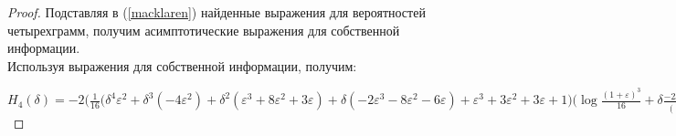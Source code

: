 ﻿\documentclass[a4paper,12pt]{article}
\theoremstyle{plain}
\begin{document}
\begin{proof}
	Подставляя в (\ref{macklaren}) найденные выражения для вероятностей четырехграмм, получим асимптотические выражения для собственной информации. \\
	Используя выражения для собственной информации, получим:
	
	$H_4(\delta)=-2\biggr(
	\tfrac{1}{16}\bigr(\delta^4\varepsilon^2+\delta^3(-4\varepsilon^2)+\delta^2(\varepsilon^3+8\varepsilon^2+3\varepsilon)+\delta(-2\varepsilon^3-8\varepsilon^2-6\varepsilon)+\varepsilon^3+3\varepsilon^2+3\varepsilon+1\bigr)\bigr(\log\frac{(1+\varepsilon)^3}{16} + \delta \frac{-2\varepsilon^3-8\varepsilon^2-6\varepsilon}{(1+\varepsilon)^3\ln b} +O(\delta^2)\bigr) +
	2\tfrac{1}{16}\bigr(\delta^4(-\varepsilon^2)+\delta^3\cdot4\varepsilon^2+\delta^2(-\varepsilon^3-6\varepsilon^2+\varepsilon)+\delta(2\varepsilon^3+4\varepsilon^2-2\varepsilon)-\varepsilon^3-\varepsilon^2+\varepsilon+1\bigr)\bigr(\log\frac{(1-\varepsilon)(1+\varepsilon)^2}{16} + \delta \frac{2\varepsilon^3+4\varepsilon^2-2\varepsilon}{(1-\varepsilon)(1+\varepsilon)^2\ln b} +O(\delta^2)\bigr) +
	2\tfrac{1}{16}\bigr(\delta^4(-\varepsilon^2)+\delta^3\cdot4\varepsilon^2+\delta^2(\varepsilon^3-6\varepsilon^2-\varepsilon)+\delta(-2\varepsilon^3+4\varepsilon^2+2\varepsilon)+\varepsilon^3-\varepsilon^2-\varepsilon+1\bigr)\bigr(\log\frac{(1-\varepsilon)^2(1+\varepsilon)}{16} + \delta \frac{-2\varepsilon^3+4\varepsilon^2+2\varepsilon}{(1-\varepsilon)^2(1+\varepsilon)\ln b}+O(\delta^2)\bigr) +
	\tfrac{1}{16}\bigr(\delta^4\varepsilon^2+\delta^3(-4\varepsilon^2)+\delta^2(-\varepsilon^3+4\varepsilon^2+\varepsilon)+\delta(2\varepsilon^3-2\varepsilon)-\varepsilon^3-\varepsilon^2+\varepsilon+1\bigr)\bigr(log\frac{(1-\varepsilon)(1+\varepsilon)^2}{16} + \delta \frac{2\varepsilon^3-2\varepsilon}{(1-\varepsilon)(1+\varepsilon)^2\ln b} +O(\delta^2)\bigr) +
	\tfrac{1}{16}\bigr(\delta^4\varepsilon^2+\delta^3(-4\varepsilon^2)+\delta^2(\varepsilon^3+4\varepsilon^2-\varepsilon)+\delta(-2\varepsilon^3+2\varepsilon)+\varepsilon^3-\varepsilon^2-\varepsilon+1\bigr)\bigr(\log\frac{(1-\varepsilon)^2(1+\varepsilon)}{16} + \delta \frac{-2\varepsilon^3+2\varepsilon}{(1-\varepsilon)^2(1+\varepsilon)\ln b}+O(\delta^2)\bigr) +
	\tfrac{1}{16}\bigr(\delta^4\varepsilon^2+\delta^3(-4\varepsilon^2)+\delta^2(-\varepsilon^3+8\varepsilon^2-3\varepsilon)+\delta(2\varepsilon^3-8\varepsilon^2+6\varepsilon)-\varepsilon^3+3\varepsilon^2-3\varepsilon+1\bigr)\bigr(\log\frac{(1-\varepsilon)^3}{16} + \delta \frac{2\varepsilon^3-8\varepsilon^2+6\varepsilon}{(1-\varepsilon)^3\ln b} +O(\delta^2)\bigr) 
	\biggr) = 
	\tfrac{(1+\varepsilon)^3}{16}\log\tfrac{(1+\varepsilon)^3}{16} + 3 \tfrac{(1+\varepsilon)^2(1-\varepsilon)}{16}\log\tfrac{(1+\varepsilon)^2(1-\varepsilon)}{16}+3\tfrac{(1+\varepsilon)(1-\varepsilon)^2}{16}\log\tfrac{(1+\varepsilon)(1-\varepsilon)^2}{16}+ \tfrac{(1-\varepsilon)^3}{16}\log\tfrac{(1-\varepsilon)^3}{16}+\frac{24\varepsilon\delta}{16} \log\frac{1+\varepsilon}{1-\varepsilon}+ O(\delta^2) = H_4(0)+\frac{24\varepsilon\delta}{16} \log\frac{1+\varepsilon}{1-\varepsilon}+ O(\delta^2).$
\end{proof}
\end{document}
